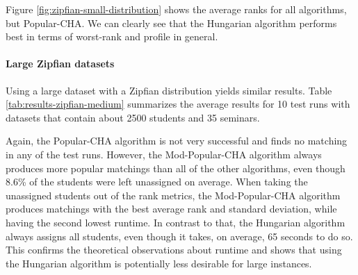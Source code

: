 Figure \ref{fig:zipfian-small-distribution} shows the average ranks for all algorithms, but Popular-CHA. We can clearly see that the Hungarian algorithm performs best in terms of worst-rank and profile in general. 

\paragraph{Large Zipfian datasets}
Using a large dataset with a Zipfian distribution yields similar results. Table \ref{tab:results-zipfian-medium} summarizes the average results for 10 test runs with datasets that contain about 2500 students and 35 seminars.

\begin{table}[h!]
  \centering
  \caption{Average results for large Zipfian dataset (2500 Students) with 10 runs}
  \label{tab:results-zipfian-medium}
\end{table}

Again, the Popular-CHA algorithm is not very successful and finds no matching in any of the test runs. However, the Mod-Popular-CHA algorithm always produces more popular matchings than all of the other algorithms, even though 8.6\% of the students were left unassigned on average. When taking the unassigned students out of the rank metrics, the Mod-Popular-CHA algorithm produces matchings with the best average rank and standard deviation, while having the second lowest runtime. In contrast to that, the Hungarian algorithm always assigns all students, even though it takes, on average, 65 seconds to do so. This confirms the theoretical observations about runtime and shows that using the Hungarian algorithm is potentially less desirable for large instances.

